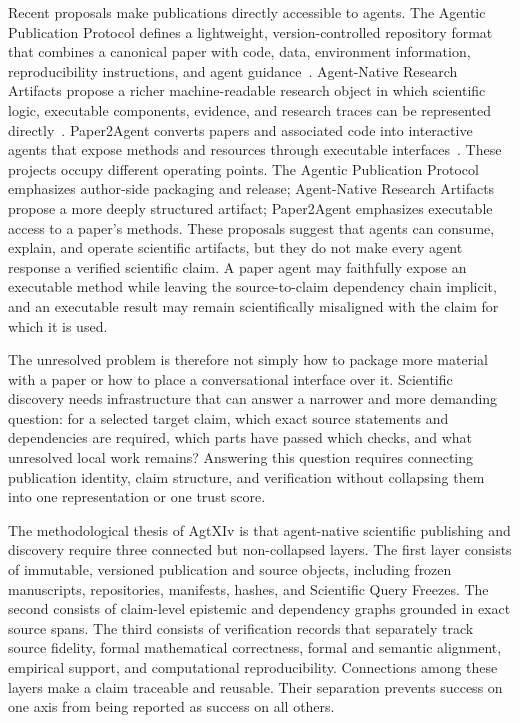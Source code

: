 Recent proposals make publications directly accessible to agents. The Agentic Publication Protocol defines a lightweight, version-controlled repository format that combines a canonical paper with code, data, environment information, reproducibility instructions, and agent guidance~\cite{lu2026app}. Agent-Native Research Artifacts propose a richer machine-readable research object in which scientific logic, executable components, evidence, and research traces can be represented directly~\cite{liu2026ara}. Paper2Agent converts papers and associated code into interactive agents that expose methods and resources through executable interfaces~\cite{miao2025paper2agent}. These projects occupy different operating points. The Agentic Publication Protocol emphasizes author-side packaging and release; Agent-Native Research Artifacts propose a more deeply structured artifact; Paper2Agent emphasizes executable access to a paper's methods. These proposals suggest that agents can consume, explain, and operate scientific artifacts, but they do not make every agent response a verified scientific claim. A paper agent may faithfully expose an executable method while leaving the source-to-claim dependency chain implicit, and an executable result may remain scientifically misaligned with the claim for which it is used.

The unresolved problem is therefore not simply how to package more material with a paper or how to place a conversational interface over it. Scientific discovery needs infrastructure that can answer a narrower and more demanding question: for a selected target claim, which exact source statements and dependencies are required, which parts have passed which checks, and what unresolved local work remains? Answering this question requires connecting publication identity, claim structure, and verification without collapsing them into one representation or one trust score.

The methodological thesis of AgtXIv is that agent-native scientific publishing and discovery require three connected but non-collapsed layers. The first layer consists of immutable, versioned publication and source objects, including frozen manuscripts, repositories, manifests, hashes, and Scientific Query Freezes. The second consists of claim-level epistemic and dependency graphs grounded in exact source spans. The third consists of verification records that separately track source fidelity, formal mathematical correctness, formal and semantic alignment, empirical support, and computational reproducibility. Connections among these layers make a claim traceable and reusable. Their separation prevents success on one axis from being reported as success on all others.

